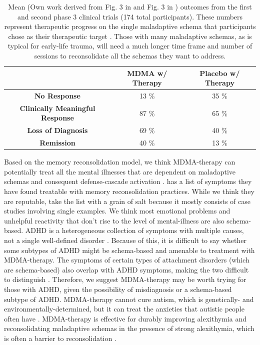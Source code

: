 \documentclass[12pt,letterpaper]{book}
\begin{document}
\FloatBarrier
\begin{table}[h!]
    \centering
    \caption{Mean (Own work derived from Fig. 3 in \textcite{mitchellMDMAClinicalTrial} and Fig. 3 in \textcite{mitchellMDMAClinicalTrial2}) outcomes from the first and second phase 3 clinical trials (174 total participants). These numbers represent therapeutic progress on the single maladaptive schema that participants chose as their therapeutic target \cite{powerTrip}. Those with many maladaptive schemas, as is typical for early-life trauma, will need a much longer time frame and number of sessions to reconsolidate all the schemas they want to address.}
    \label{table:efficacy}
    \begin{tabular}{|c|c|c|}
    \hline
     & \textbf{MDMA w/ Therapy} & \textbf{Placebo w/ Therapy} \\ \hline
    \textbf{No Response}          & 13 \%          & 35 \%          \\ \hline
    \textbf{Clinically Meaningful Response}          & 87 \%          & 65 \%         \\ \hline
    \textbf{Loss of Diagnosis} & 69 \% & 40 \% \\ \hline
    \textbf{Remission}          & 40 \%          & 13 \%          \\ \hline
    \end{tabular}
\end{table}
\FloatBarrier

Based on the memory reconsolidation model, we think MDMA-therapy can potentially treat all the mental illnesses that are dependent on maladaptive schemas and consequent defense-cascade activation \cite{carhart2019rebus,eckerUnlocking}. \textcite{coherenceSymptoms} has a list of symptoms they have found treatable with memory reconsolidation practices. While we think they are reputable, take the list with a grain of salt because it mostly consists of case studies involving single examples. We think most emotional problems and unhelpful reactivity that don't rise to the level of mental-illness are also schema-based. ADHD is a heterogeneous collection of symptoms with multiple causes, not a single well-defined disorder \cite{luoADHDcauses}. Because of this, it is difficult to say whether some subtypes of ADHD might be schema-based and amenable to treatment with MDMA-therapy. The symptoms of certain types of attachment disorders (which are schema-based) also overlap with ADHD symptoms, making the two difficult to distinguish \cite{follan2011discrimination}. Therefore, we suggest MDMA-therapy may be worth trying for those with ADHD, given the possibility of misdiagnosis or a schema-based subtype of ADHD. MDMA-therapy cannot cure autism, which is genetically- and environmentally-determined, but it can treat the anxieties that autistic people often have \cite{taylorAutismEtiology,danforth2018autismMDMA}. MDMA-therapy is effective for durably improving alexithymia and reconsolidating maladaptive schemas in the presence of strong alexithymia, which is often a barrier to reconsolidation \cite{vanSelfExperience}.
\end{document}
